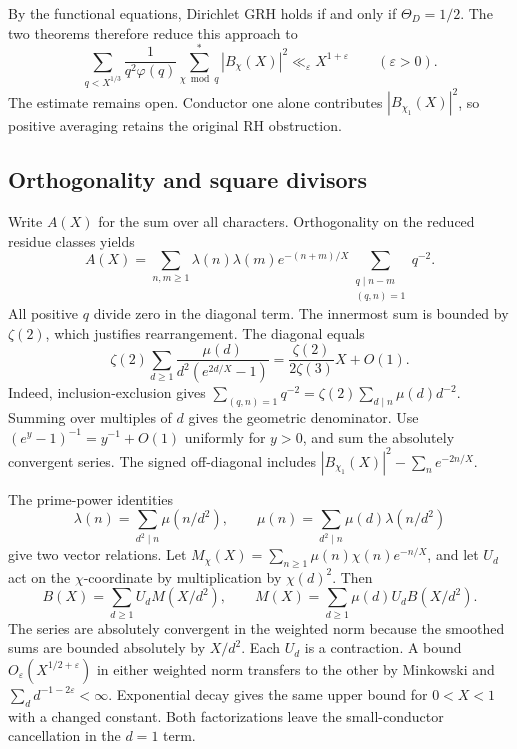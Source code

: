 By the functional equations, Dirichlet GRH holds if and only if \(\Theta_D=1/2\). The two theorems therefore reduce this approach to
\[
 \sum_{q<X^{1/3}}\frac{1}{q^2\varphi(q)}
       \sum_{\chi\bmod q}^{*}|B_\chi(X)|^2
       \ll_\varepsilon X^{1+\varepsilon}
       \qquad(\varepsilon>0).
\]
The estimate remains open. Conductor one alone contributes \(|B_{\chi_1}(X)|^2\), so positive averaging retains the original RH obstruction.

\subsection{Orthogonality and square divisors}

Write \(A(X)\) for the sum over all characters. Orthogonality on the reduced residue classes yields
\[
 A(X)=\sum_{n,m\ge1}\lambda(n)\lambda(m)e^{-(n+m)/X}
          \sum_{\substack{q\mid n-m\\(q,n)=1}}q^{-2}.
\]
All positive \(q\) divide zero in the diagonal term. The innermost sum is bounded by \(\zeta(2)\), which justifies rearrangement. The diagonal equals
\[
 \zeta(2)\sum_{d\ge1}\frac{\mu(d)}{d^2(e^{2d/X}-1)}
 =\frac{\zeta(2)}{2\zeta(3)}X+O(1).
\]
Indeed, inclusion-exclusion gives \(\sum_{(q,n)=1}q^{-2}=\zeta(2)\sum_{d\mid n}\mu(d)d^{-2}\). Summing over multiples of \(d\) gives the geometric denominator. Use \((e^y-1)^{-1}=y^{-1}+O(1)\) uniformly for \(y>0\), and sum the absolutely convergent series. The signed off-diagonal includes \(|B_{\chi_1}(X)|^2-\sum_ne^{-2n/X}\).

The prime-power identities
\[
 \lambda(n)=\sum_{d^2\mid n}\mu(n/d^2),\qquad
 \mu(n)=\sum_{d^2\mid n}\mu(d)\lambda(n/d^2)
\]
give two vector relations. Let \(M_\chi(X)=\sum_{n\ge1}\mu(n)\chi(n)e^{-n/X}\), and let \(U_d\) act on the \(\chi\)-coordinate by multiplication by \(\chi(d)^2\). Then
\[
 B(X)=\sum_{d\ge1}U_d M(X/d^2),\qquad
 M(X)=\sum_{d\ge1}\mu(d)U_d B(X/d^2).
\]
The series are absolutely convergent in the weighted norm because the smoothed sums are bounded absolutely by \(X/d^2\). Each \(U_d\) is a contraction. A bound \(O_\varepsilon(X^{1/2+\varepsilon})\) in either weighted norm transfers to the other by Minkowski and \(\sum_d d^{-1-2\varepsilon}<\infty\). Exponential decay gives the same upper bound for \(0<X<1\) with a changed constant. Both factorizations leave the small-conductor cancellation in the \(d=1\) term.


